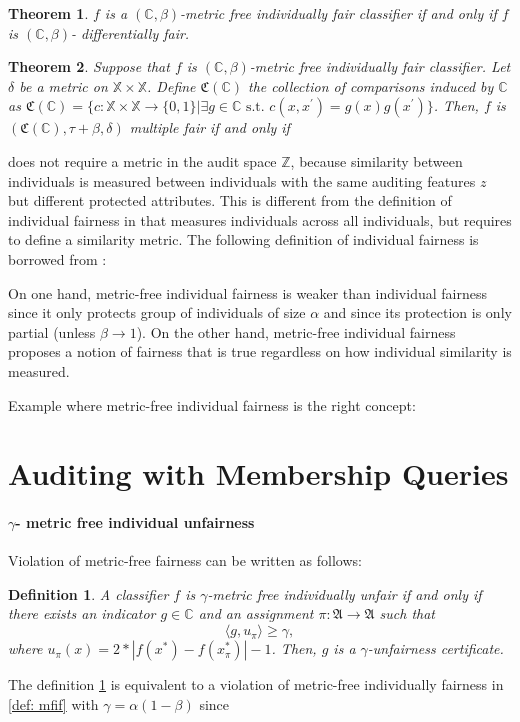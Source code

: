 \documentclass{article}
\newtheorem{thm}{Theorem}[section]
\newtheorem{defn}{Definition}[section]
\begin{document}
\begin{thm}
\label{thm: df}
$f$ is a $(\mathbb{C}, \beta)$-metric free individually fair classifier if and only if $f$ is $(\mathbb{C}, \beta)$- differentially fair.
\end{thm}


\begin{thm}
\label{thm: mf}
Suppose that $f$ is $(\mathbb{C}, \beta)$-metric free individually fair classifier. Let $\delta$ be a metric on $\mathbb{X}\times \mathbb{X}$. Define $\mathfrak{C}(\mathbb{C})$ the collection of comparisons induced by $\mathbb{C}$ as $\mathfrak{C}(\mathbb{C})= \{c: \mathbb{X}\times \mathbb{X} \rightarrow \{0, 1\}| \exists g\in \mathbb{C} \mbox{ s.t. } c(x, x^{'})=g(x)g(x^{'})\}$. Then, $f$ is $(\mathfrak{C}(\mathbb{C}), \tau + \beta, \delta)$ multiple fair if and only if  
\end{thm}


does not require a metric in the audit space $\mathbb{Z}$, because similarity between individuals is measured between individuals with the same auditing features $z$ but different protected attributes. This is different from the definition of individual fairness in \cite{dwork2012fairness} that measures individuals across all individuals, but requires to define a similarity metric. The following definition of individual fairness is borrowed from \cite{dwork2012fairness}:



On one hand, metric-free individual fairness is weaker than individual fairness since it only protects group of individuals of size $\alpha$ and since its protection is only partial (unless $\beta \rightarrow 1$). On the other hand, metric-free individual fairness proposes a notion of fairness that is true regardless on how individual similarity is measured. 

\bigskip
Example where metric-free individual fairness is the right concept: 


\section{Auditing with Membership Queries}

\paragraph{$\gamma$- metric free individual unfairness}
Violation of metric-free fairness can be written as follows:

\begin{defn}
\label{def: unfair}
A classifier $f$ is $\gamma$-metric free individually unfair if and only if there exists an indicator $g\in \mathbb{C}$  and an assignment $\pi:\mathfrak{A} \rightarrow \mathfrak{A}$ such that
$$\langle g, u_{\pi}\rangle \geq \gamma,$$
where $u_{\pi}(x)=2*|f(x^{*})-f(x_{\pi}^{*})| - 1$. Then, $g$ is a $\gamma$-unfairness certificate. 
\end{defn}
The definition \ref{def: unfair} is equivalent to a violation of metric-free individually fairness in \ref{def: mfif} with $\gamma=\alpha (1-\beta)$ since 
\end{document}
